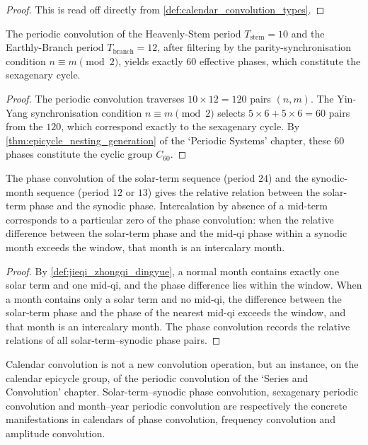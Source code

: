 \begin{proof}
This is read off directly from \cref{def:calendar_convolution_types}.
\end{proof}

\begin{proposition}\label{prop:ganzhi_periodic_convolution}
The periodic convolution of the Heavenly-Stem period \(T_{\text{stem}}=10\) and the Earthly-Branch period \(T_{\text{branch}}=12\), after filtering by the parity-synchronisation condition \(n\equiv m\pmod 2\), yields exactly \(60\) effective phases, which constitute the sexagenary cycle.
\end{proposition}

\begin{proof}
The periodic convolution traverses \(10\times 12=120\) pairs \((n,m)\). The Yin-Yang synchronisation condition \(n\equiv m\pmod 2\) selects \(5\times 6+5\times 6=60\) pairs from the \(120\), which correspond exactly to the sexagenary cycle. By \cref{thm:epicycle_nesting_generation} of the `Periodic Systems' chapter, these \(60\) phases constitute the cyclic group \(C_{60}\).
\end{proof}

\begin{proposition}\label{prop:jieqi_synodic_phase_convolution}
The phase convolution of the solar-term sequence (period \(24\)) and the synodic-month sequence (period \(12\) or \(13\)) gives the relative relation between the solar-term phase and the synodic phase. Intercalation by absence of a mid-term corresponds to a particular zero of the phase convolution: when the relative difference between the solar-term phase and the mid-qi phase within a synodic month exceeds the window, that month is an intercalary month.
\end{proposition}

\begin{proof}
By \cref{def:jieqi_zhongqi_dingyue}, a normal month contains exactly one solar term and one mid-qi, and the phase difference lies within the window. When a month contains only a solar term and no mid-qi, the difference between the solar-term phase and the phase of the nearest mid-qi exceeds the window, and that month is an intercalary month. The phase convolution records the relative relations of all solar-term--synodic phase pairs.
\end{proof}

\begin{remark}\label{rem:calendar_convolution_relation}
Calendar convolution is not a new convolution operation, but an instance, on the calendar epicycle group, of the periodic convolution of the `Series and Convolution' chapter. Solar-term--synodic phase convolution, sexagenary periodic convolution and month--year periodic convolution are respectively the concrete manifestations in calendars of phase convolution, frequency convolution and amplitude convolution.
\end{remark}

